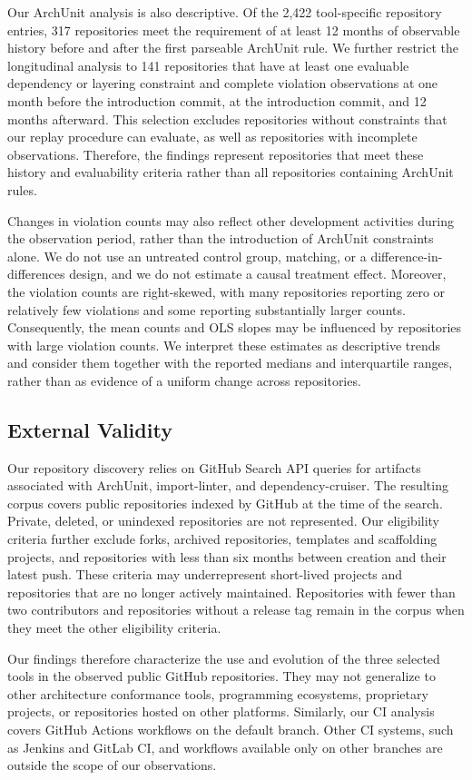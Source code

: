Our ArchUnit analysis is also descriptive. Of the 2,422
tool-specific repository entries, 317 repositories meet the
requirement of at least 12 months of observable history before
and after the first parseable ArchUnit rule. We further restrict
the longitudinal analysis to 141 repositories that have at least
one evaluable dependency or layering constraint and complete
violation observations at one month before the introduction
commit, at the introduction commit, and 12 months afterward.
This selection excludes repositories without constraints that
our replay procedure can evaluate, as well as repositories with
incomplete observations. Therefore, the findings represent
repositories that meet these history and evaluability criteria
rather than all repositories containing ArchUnit rules.

Changes in violation counts may also reflect other development
activities during the observation period, rather than the
introduction of ArchUnit constraints alone. We do not use an
untreated control group, matching, or a difference-in-differences
design, and we do not estimate a causal treatment effect.
Moreover, the violation counts are right-skewed, with many
repositories reporting zero or relatively few violations and
some reporting substantially larger counts. Consequently,
the mean counts and OLS slopes may be influenced by repositories
with large violation counts. We interpret these estimates as
descriptive trends and consider them together with the reported
medians and interquartile ranges, rather than as evidence of a
uniform change across repositories.

\subsection{External Validity}
\label{sec:threats-external}

Our repository discovery relies on GitHub Search API queries
for artifacts associated with ArchUnit, import-linter, and
dependency-cruiser. The resulting corpus covers public
repositories indexed by GitHub at the time of the search.
Private, deleted, or unindexed repositories are not represented.
Our eligibility criteria further exclude forks, archived
repositories, templates and scaffolding projects, and
repositories with less than six months between creation and
their latest push. These criteria may underrepresent short-lived
projects and repositories that are no longer actively maintained.
Repositories with fewer than two contributors and repositories
without a release tag remain in the corpus when they meet the
other eligibility criteria.

Our findings therefore characterize the use and evolution of
the three selected tools in the observed public GitHub
repositories. They may not generalize to other architecture
conformance tools, programming ecosystems, proprietary projects,
or repositories hosted on other platforms. Similarly, our CI
analysis covers GitHub Actions workflows on the default branch.
Other CI systems, such as Jenkins and GitLab CI, and workflows
available only on other branches are outside the scope of our
observations.
